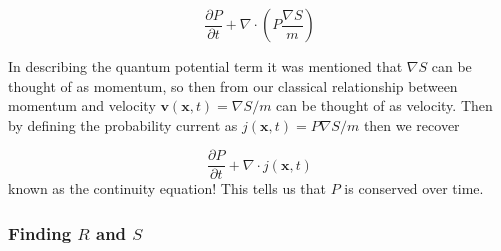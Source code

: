 \begin{equation}
\label{ProbCurrent}
\frac{\partial P}{\partial t} + \nabla \cdot \left( P \frac{\nabla S}{m} \right)
\end{equation}

In describing the quantum potential term it was mentioned that $\nabla S$ can be thought of as momentum, so then from our classical relationship between momentum and velocity  $\textbf{v}(\textbf{x},t)=\nabla S/m$ can be thought of as velocity. Then by defining the probability current as $j(\mathbf{x},t) = P\nabla S/m$ then we recover

\begin{equation}
\label{ProbCurrent}
\frac{\partial P}{\partial t} + \nabla \cdot j(\mathbf{x},t)
\end{equation}
known as the continuity equation! This tells us that $P$ is conserved over time.

\subsubsection{Finding $R$ and $S$}

